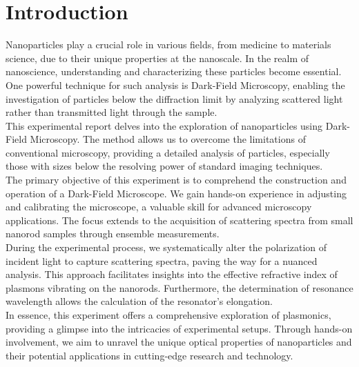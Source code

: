 \section{\label{sec:einleitung}Introduction}
Nanoparticles play a crucial role in various fields, from medicine to materials science, 
due to their unique properties at the nanoscale. 
In the realm of nanoscience, understanding and characterizing these particles become essential. 
One powerful technique for such analysis is Dark-Field Microscopy, enabling the investigation of 
particles below the diffraction limit by analyzing scattered light rather than transmitted light 
through the sample. \\
This experimental report delves into the exploration of nanoparticles using Dark-Field Microscopy. 
The method allows us to overcome the limitations of conventional microscopy, 
providing a detailed analysis of particles, especially those with sizes below the resolving 
power of standard imaging techniques. \\
The primary objective of this experiment is to comprehend the construction and operation 
of a Dark-Field Microscope. 
We gain hands-on experience in adjusting and calibrating the microscope, a valuable skill 
for advanced microscopy applications. 
The focus extends to the acquisition of scattering spectra from small nanorod samples 
through ensemble measurements. \\
During the experimental process, we systematically alter the polarization of incident 
light to capture scattering spectra, paving the way for a nuanced analysis. 
This approach facilitates insights into the effective refractive index of plasmons vibrating 
on the nanorods. 
Furthermore, the determination of resonance wavelength allows the calculation 
of the resonator's elongation. \\
In essence, this experiment offers a comprehensive exploration of plasmonics, 
providing a glimpse into the intricacies of experimental setups. 
Through hands-on involvement, we aim to unravel the unique optical properties 
of nanoparticles and their potential applications in cutting-edge research and technology. \\